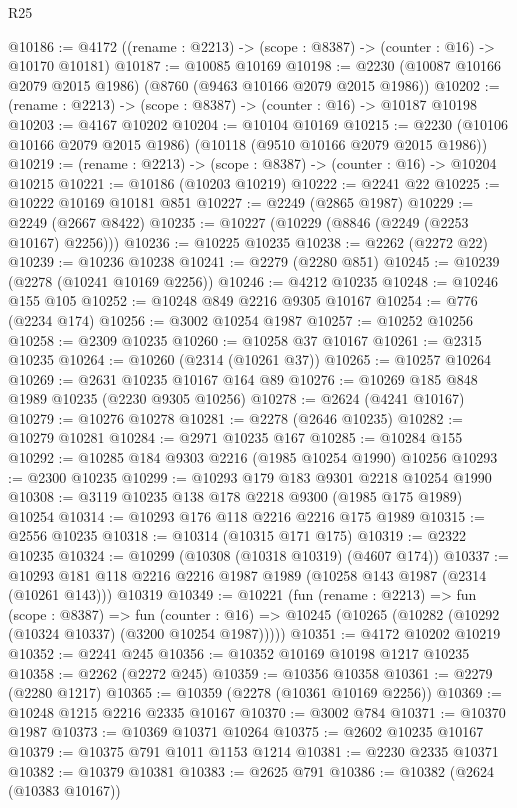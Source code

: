 \begin{lexlean}{R25}
\begin{coremodule}
@10186 := @4172 ((rename : @2213) -> (scope : @8387) -> (counter : @16) -> @10170 @10181)
@10187 := @10085 @10169
@10198 := @2230 (@10087 @10166 @2079 @2015 @1986) (@8760 (@9463 @10166 @2079 @2015 @1986))
@10202 := (rename : @2213) -> (scope : @8387) -> (counter : @16) -> @10187 @10198
@10203 := @4167 @10202
@10204 := @10104 @10169
@10215 := @2230 (@10106 @10166 @2079 @2015 @1986) (@10118 (@9510 @10166 @2079 @2015 @1986))
@10219 := (rename : @2213) -> (scope : @8387) -> (counter : @16) -> @10204 @10215
@10221 := @10186 (@10203 @10219)
@10222 := @2241 @22
@10225 := @10222 @10169 @10181 @851
@10227 := @2249 (@2865 @1987)
@10229 := @2249 (@2667 @8422)
@10235 := @10227 (@10229 (@8846 (@2249 (@2253 @10167) @2256)))
@10236 := @10225 @10235
@10238 := @2262 (@2272 @22)
@10239 := @10236 @10238
@10241 := @2279 (@2280 @851)
@10245 := @10239 (@2278 (@10241 @10169 @2256))
@10246 := @4212 @10235
@10248 := @10246 @155 @105
@10252 := @10248 @849 @2216 @9305 @10167
@10254 := @776 (@2234 @174)
@10256 := @3002 @10254 @1987
@10257 := @10252 @10256
@10258 := @2309 @10235
@10260 := @10258 @37 @10167
@10261 := @2315 @10235
@10264 := @10260 (@2314 (@10261 @37))
@10265 := @10257 @10264
@10269 := @2631 @10235 @10167 @164 @89
@10276 := @10269 @185 @848 @1989 @10235 (@2230 @9305 @10256)
@10278 := @2624 (@4241 @10167)
@10279 := @10276 @10278
@10281 := @2278 (@2646 @10235)
@10282 := @10279 @10281
@10284 := @2971 @10235 @167
@10285 := @10284 @155
@10292 := @10285 @184 @9303 @2216 (@1985 @10254 @1990) @10256
@10293 := @2300 @10235
@10299 := @10293 @179 @183 @9301 @2218 @10254 @1990
@10308 := @3119 @10235 @138 @178 @2218 @9300 (@1985 @175 @1989) @10254
@10314 := @10293 @176 @118 @2216 @2216 @175 @1989
@10315 := @2556 @10235
@10318 := @10314 (@10315 @171 @175)
@10319 := @2322 @10235
@10324 := @10299 (@10308 (@10318 @10319) (@4607 @174))
@10337 := @10293 @181 @118 @2216 @2216 @1987 @1989 (@10258 @143 @1987 (@2314 (@10261 @143))) @10319
@10349 := @10221
    (fun (rename : @2213) =>
    fun (scope : @8387) =>
    fun (counter : @16) => @10245 (@10265 (@10282 (@10292 (@10324 @10337) (@3200 @10254 @1987)))))
@10351 := @4172 @10202 @10219
@10352 := @2241 @245
@10356 := @10352 @10169 @10198 @1217 @10235
@10358 := @2262 (@2272 @245)
@10359 := @10356 @10358
@10361 := @2279 (@2280 @1217)
@10365 := @10359 (@2278 (@10361 @10169 @2256))
@10369 := @10248 @1215 @2216 @2335 @10167
@10370 := @3002 @784
@10371 := @10370 @1987
@10373 := @10369 @10371 @10264
@10375 := @2602 @10235 @10167
@10379 := @10375 @791 @1011 @1153 @1214
@10381 := @2230 @2335 @10371
@10382 := @10379 @10381
@10383 := @2625 @791
@10386 := @10382 (@2624 (@10383 @10167))

\end{coremodule}
\end{lexlean}
